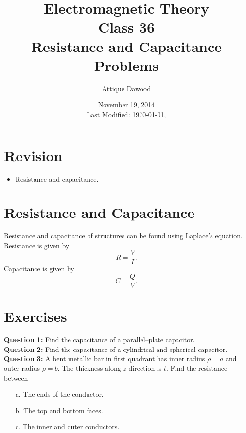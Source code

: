 \documentclass[12pt,a4paper]{article}
\title{Electromagnetic Theory\\Class 36\\Resistance and Capacitance\\Problems}
\author{Attique Dawood}
\date{November 19, 2014\\[0.2cm] Last Modified: \today, \currenttime}
\begin{document}
\maketitle
\section{Revision}
\begin{itemize}
\item Resistance and capacitance.
\end{itemize}
\section{Resistance and Capacitance}
Resistance and capacitance of structures can be found using Laplace's equation. Resistance is given by
\begin{equation}
R=\dfrac{V}{I}.
\end{equation}
Capacitance is given by
\begin{equation}
C=\dfrac{Q}{V}.
\end{equation}
\section{Exercises}
\noindent\textbf{Question 1:} Find the capacitance of a parallel--plate capacitor.\\[0.2cm]
\noindent\textbf{Question 2:} Find the capacitance of a cylindrical and spherical capacitor.\\[0.2cm]
\noindent\textbf{Question 3:} A bent metallic bar in first quadrant has inner radius $\rho=a$ and outer radius $\rho=b$. The thickness along $z$ direction is $t$. Find the resistance between
\begin{itemize}
\item[a.] The ends of the conductor.
\item[b.] The top and bottom faces.
\item[c.] The inner and outer conductors.
\end{itemize}
%
%
\end{document}

